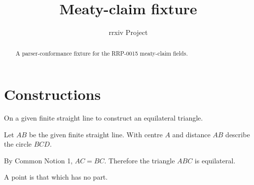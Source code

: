 \documentclass{rrxiv}
\title{Meaty-claim fixture}
\author{rrxiv Project}
\begin{document}
\maketitle

\begin{abstract}
A parser-conformance fixture for the RRP-0015 meaty-claim fields.
\end{abstract}

\section{Constructions}
\label{sec:constructions}

\begin{claim}
\label{prop:I.1}
On a given finite straight line to construct an equilateral triangle.
\end{claim}

\begin{evidence}[Proof of I.1]
\label{ev:I.1}

Let $AB$ be the given finite straight line. With centre $A$ and
distance $AB$ describe the circle $BCD$.

By Common Notion 1, $AC = BC$. Therefore the triangle $ABC$ is
equilateral.
\end{evidence}

\begin{claim}
\label{def:I.1}
A point is that which has no part.
\end{claim}
\end{document}
